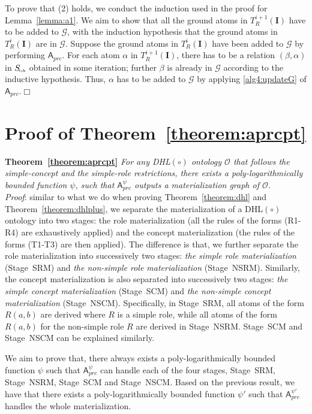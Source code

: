 To prove that (2) holds, we conduct the induction used in the proof for Lemma~\ref{lemma:a1}.
We aim to show that all the ground atoms in $T_R^{i+1}(\textbf{I})$ have to be added to $\mathcal{G}$,
with the induction hypothesis that the ground atoms in $T_R^{i}(\textbf{I})$ are in $\mathcal{G}$.
Suppose the ground atoms in $T_R^{i}(\textbf{I})$ have been added to $\mathcal{G}$ by
performing $\mathsf{A}_{prc}$.
For each atom $\alpha$ in $T_R^{i+1}(\textbf{I})$, there has to be a relation $(\beta,\alpha)$
in $S_{\textit{\!\tiny rch}}$ obtained in some iteration; further
$\beta$ is already in $\mathcal{G}$ according to the inductive hypothesis. Thus,
$\alpha$ has to be added to $\mathcal{G}$ by applying \ref{alg4:updateG}
of $\mathsf{A}_{prc}$.\hfill$\Box$


\section{Proof of Theorem~\ref{theorem:aprcpt}}

\textbf{Theorem~\ref{theorem:aprcpt}}
\emph{For any DHL$(\circ)$ ontology $\mathcal{O}$ that follows the simple-concept and the simple-role
restrictions,
there exists a poly-logarithmically bounded function $\psi$,
such that $\mathsf{A}_{prc}^{\psi}$ outputs
a materialization graph of $\mathcal{O}$.}\\

\noindent\emph{Proof}: similar to what we do when proving
Theorem~\ref{theorem:dhl} and Theorem~\ref{theorem:dhlplus},
we separate the materialization of a DHL$(\circ)$ ontology
into two stages: the role materialization (all the rules
of the forms (R1-R4) are exhaustively applied) and the concept materialization
(the rules of the forms (T1-T3)
are then applied). The difference is that, we further separate the role materialization
into successively two stages: \emph{the simple role materialization} (Stage~SRM) and
\emph{the non-simple role materialization} (Stage~NSRM).
Similarly, the concept materialization is also separated into successively two stages:
\emph{the simple concept materialization} (Stage~SCM) and
\emph{the non-simple concept materialization} (Stage~NSCM).
Specifically, in Stage~SRM, all atoms of the form $R(a,b)$ are derived
where $R$ is a simple role, while all atoms of the form $R(a,b)$ for the non-simple
role $R$ are derived in Stage~NSRM. Stage~SCM and Stage~NSCM can be explained similarly.

We aim to prove that, there always exists a poly-logarithmically bounded function $\psi$
such that $\mathsf{A}_{prc}^{\psi}$ can handle each of the four stages, Stage~SRM,
Stage~NSRM, Stage~SCM and Stage~NSCM. Based on the previous result, we have that
there exists a poly-logarithmically bounded function $\psi'$
such that $\mathsf{A}_{prc}^{\psi'}$ handles the whole materialization.

